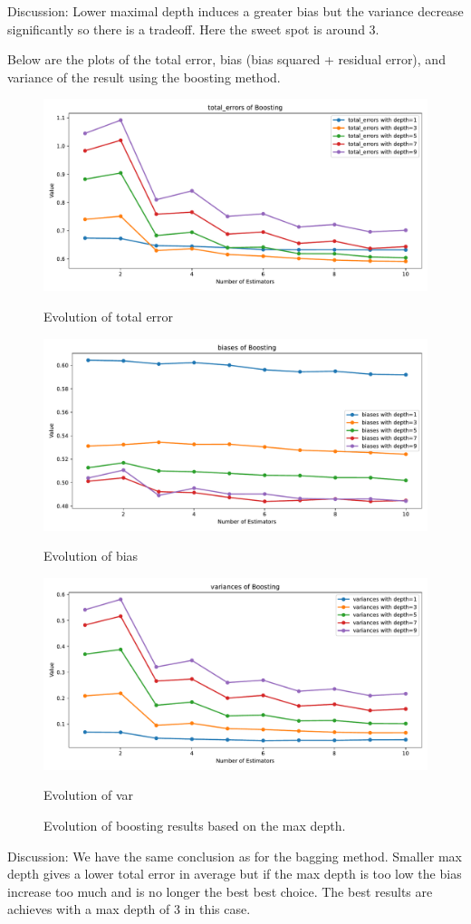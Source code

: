 \documentclass[a4paper,10pt]{article}
\begin{document}
Discussion:
Lower maximal depth induces a greater bias but the variance decrease significantly so there is a tradeoff. Here the sweet spot is around 3.

Below are the plots of the total error, bias (bias squared + residual error), and variance of the result using the boosting method.

\begin{figure}[H]
    \centering 
    \begin{minipage}{0.33\textwidth}
        \centering
        \includegraphics[width=\linewidth]{images/2.5_total_error_boosting.pdf}
        \caption{Evolution of total error}
    \end{minipage}%
    \begin{minipage}{0.33\textwidth}
        \centering
        \includegraphics[width=\linewidth]{images/2.5_bias_boosting.pdf}
        \caption{Evolution of bias}
    \end{minipage}%
    \begin{minipage}{0.33\textwidth}
        \centering
        \includegraphics[width=\linewidth]{images/2.5_var_boosting.pdf}
        \caption{Evolution of var}
    \end{minipage}
    \caption{Evolution of boosting results based on the max depth.}
\end{figure}

Discussion:
We have the same conclusion as for the bagging method. Smaller max depth gives a lower total error in average but if the max depth is too low the bias increase too much and is no longer the best best choice. The best results are achieves with a max depth of 3 in this case.
\end{document}
